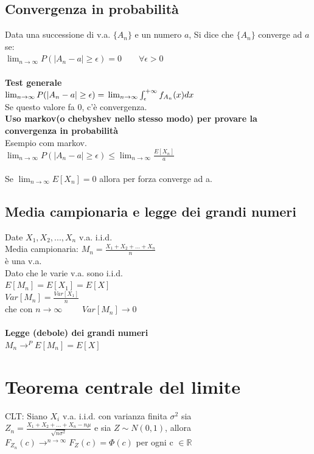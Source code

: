\documentclass{article}
\begin{document}
\begin{multicols*}{3}
		
		\subsection{Convergenza in probabilità}
		Data una successione di v.a. \(\{A_n\}\) e un numero \(a\), Si dice che \(\{A_n\}\) converge ad \(a\) se:\\
		\(\lim_{n \rightarrow \infty} P(|A_n - a| \geq \epsilon ) = 0 \qquad \forall \epsilon > 0\)\\\\
		\textbf{Test generale}\\
		\(\lim_{n \rightarrow \infty} P(|A_n - a| \geq \epsilon ) =\\ \lim_{n\rightarrow\infty}\int_{\epsilon}^{+\infty} f_{A_n}(x) dx\)\\
		Se questo valore fa 0, c'è convergenza.\\
		
		\textbf{Uso markov(o chebyshev nello stesso modo) per provare la convergenza in probabilità}\\
		Esempio com markov.\\
		\(\lim_{n \rightarrow \infty} P(|A_n - a| \geq \epsilon ) \leq \lim_{n \rightarrow\infty}\frac{E[X_n]}{a} \)\\\\
		Se \(\lim_{n \rightarrow\infty}E[X_n] = 0\) allora per forza converge ad a.\\
		
		\subsection{Media campionaria e legge dei grandi numeri}
		Date \(X_1,X_2,...,X_n\) v.a. i.i.d.\\
		Media campionaria: \(M_n= \frac{X_1+X_2+...+X_n}{n} \)\\ è una v.a.\\
		Dato che le varie v.a. sono i.i.d.\\ \(E[M_n] =E[X_1]=E[X]\)\\
		\(Var[M_n] = \frac{Var[X_1]}{n} \)\\ che con \(n \rightarrow \infty \qquad\) \(Var[M_n] \rightarrow 0\)\\\\
		\textbf{Legge (debole) dei grandi numeri}\\
		\(M_n \longrightarrow^P E[M_n] = E[X]\)\\
		
		\section{Teorema centrale del limite}
		CLT: Siano \(X_i\) v.a. i.i.d. con varianza finita \(\sigma^2\) sia\\
		\(Z_n =  \frac{X_1+X_2+...+X_n - n\mu}{\sqrt{n\sigma^2}} \) e sia \(Z\sim N(0,1)\), allora \(F_{Z_n}(c) \rightarrow^{n\rightarrow \infty} F_Z(c)=\Phi(c) \) per ogni c \(\in \mathbb{R}\)	
		

\end{multicols*}
\end{document}
